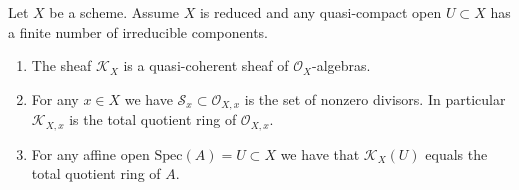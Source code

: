 \begin{lemma}
\label{lemma-reduced-finite-irreducible}
Let $X$ be a scheme.
Assume $X$ is reduced and any quasi-compact open $U \subset X$
has a finite number of irreducible components.
\begin{enumerate}
\item The sheaf $\mathcal{K}_X$ is a quasi-coherent sheaf of
$\mathcal{O}_X$-algebras.
\item For any $x \in X$ we have $\mathcal{S}_x \subset \mathcal{O}_{X, x}$
is the set of nonzero divisors. In particular $\mathcal{K}_{X, x}$
is the total quotient ring of $\mathcal{O}_{X, x}$.
\item For any affine open $\text{Spec}(A) = U \subset X$ we have
that $\mathcal{K}_X(U)$ equals the total quotient ring of $A$.
\end{enumerate}
\end{lemma}


